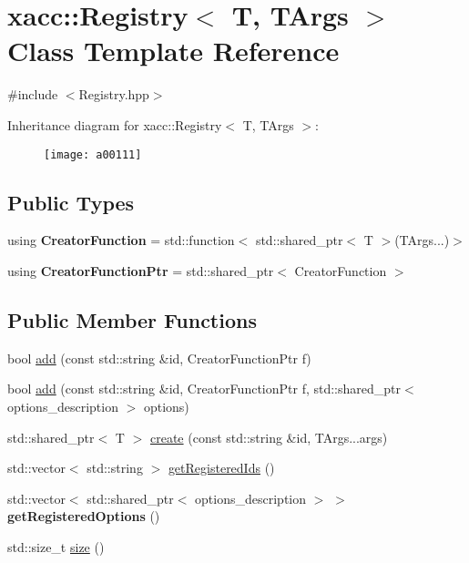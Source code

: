 \hypertarget{a00111}{}\section{xacc\+:\+:Registry$<$ T, T\+Args $>$ Class Template Reference}
\label{a00111}


{\ttfamily \#include $<$Registry.\+hpp$>$}

Inheritance diagram for xacc\+:\+:Registry$<$ T, T\+Args $>$\+:\begin{figure}[H]
\begin{center}
\leavevmode
\texttt{[image: a00111]}
\end{center}
\end{figure}
\subsection*{Public Types}
\begin{DoxyCompactItemize}
\item 
using {\bfseries Creator\+Function} = std\+::function$<$ std\+::shared\+\_\+ptr$<$ T $>$(T\+Args...)$>$\hypertarget{a00111_a784134d683dee924996e12d32a6da16c}{}\label{a00111_a784134d683dee924996e12d32a6da16c}

\item 
using {\bfseries Creator\+Function\+Ptr} = std\+::shared\+\_\+ptr$<$ Creator\+Function $>$\hypertarget{a00111_a2e7d22d66dcc4644e01bcc398a3e23cc}{}\label{a00111_a2e7d22d66dcc4644e01bcc398a3e23cc}

\end{DoxyCompactItemize}
\subsection*{Public Member Functions}
\begin{DoxyCompactItemize}
\item 
bool \hyperlink{a00111_a5ec7144ddc944674313badd32452fecc}{add} (const std\+::string \&id, Creator\+Function\+Ptr f)
\item 
bool \hyperlink{a00111_a51d98b5cf6e2722655a2f597b436aa80}{add} (const std\+::string \&id, Creator\+Function\+Ptr f, std\+::shared\+\_\+ptr$<$ options\+\_\+description $>$ options)
\item 
std\+::shared\+\_\+ptr$<$ T $>$ \hyperlink{a00111_aecccbd5534276cbdd1553e43c942219b}{create} (const std\+::string \&id, T\+Args...\+args)
\item 
std\+::vector$<$ std\+::string $>$ \hyperlink{a00111_a8bff6f5c50534375abc4026662d69d2e}{get\+Registered\+Ids} ()
\item 
std\+::vector$<$ std\+::shared\+\_\+ptr$<$ options\+\_\+description $>$ $>$ {\bfseries get\+Registered\+Options} ()\hypertarget{a00111_ad1fef83142cd38d0727471c15507a0ea}{}\label{a00111_ad1fef83142cd38d0727471c15507a0ea}

\item 
std\+::size\+\_\+t \hyperlink{a00111_a2352dd7c6c85ae5c5e232b577dfa2544}{size} ()
\end{DoxyCompactItemize}
